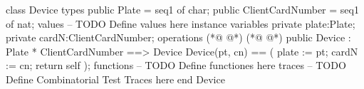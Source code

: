 \begin{vdmpp}[breaklines=true]
class Device
types
 public Plate = seq1 of char;
 public ClientCardNumber = seq1 of nat;
values
-- TODO Define values here
instance variables
 private plate:Plate;
 private cardN:ClientCardNumber;
operations
(*@
\label{Client:11}
@*)
(*@
\label{Device:11}
@*)
  public Device : Plate * ClientCardNumber ==> Device
   Device(pt, cn) == (
    plate := pt;
    cardN := cn;
    return self
   );
functions
-- TODO Define functiones here
traces
-- TODO Define Combinatorial Test Traces here
end Device
\end{vdmpp}
